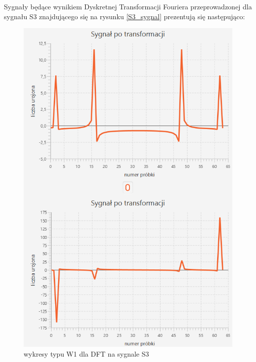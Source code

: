 \documentclass[12pt]{article}
\begin{document}
Sygnały będące wynikiem Dyskretnej Transformacji Fouriera przeprowadzonej dla sygnału S3 znajdującego się na rysunku \ref{S3_sygnal} prezentują się następująco:
\begin{figure}[H]
	\centering
	\includegraphics[width=\linewidth]{S3_DFT_W1.png}
	\caption{wykresy typu W1 dla DFT na sygnale S3}
	\label{S3_DFT_W1}
\end{figure}
\end{document}
